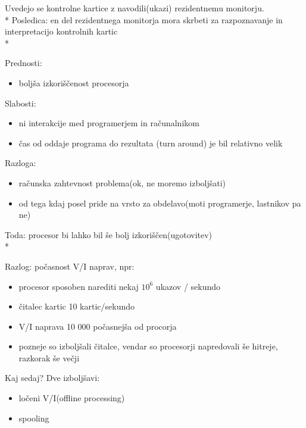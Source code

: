 \documentclass[
  slovene,
  a4paper
]{book}
\begin{document}
Uvedejo se kontrolne kartice z navodili(ukazi) rezidentnemu monitorju.\\*
Posledica: en del rezidentnega monitorja mora skrbeti  za razpoznavanje in interpretacijo kontrolnih kartic\\*

Prednosti:
\begin{itemize}
  \item boljša izkoriščenost procesorja
\end{itemize}

Slabosti:
\begin{itemize}
  \item ni interakcije med programerjem in računalnikom
  \item čas od oddaje programa do rezultata (turn around) je bil relativno velik
\end{itemize}

Razloga:
\begin{itemize}
  \item računska zahtevnost problema(ok, ne moremo izboljšati)
  \item od tega kdaj posel pride na vrsto za obdelavo(moti programerje, lastnikov pa ne)
\end{itemize}

Toda: procesor bi lahko bil še bolj izkoriščen(ugotovitev)\\*

Razlog: počasnost V/I naprav, npr: 
\begin{itemize}
  \item procesor sposoben narediti nekaj
    \begin{math}
    10^6
    \end{math}
    ukazov / sekundo

  \item čitalec kartic 10 kartic/sekundo

  \item V/I naprava 10 000 počasnejša od procorja

  \item pozneje so izboljšali čitalce, vendar so procesorji napredovali še hitreje, razkorak še večji
\end{itemize}

Kaj sedaj? Dve izboljšavi:
\begin{itemize}
  \item ločeni V/I(offline processing)
  \item spooling
\end{itemize}
\end{document}
